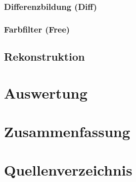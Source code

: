 \documentclass[ngerman,a4paper]{scrartcl}
\begin{document}
\subsubsection{Differenzbildung (Diff)}

\subsubsection{Farbfilter (Free)}

\subsection{Rekonstruktion}


\section{Auswertung}


\section{Zusammenfassung}


\section{Quellenverzeichnis}

\end{document}
